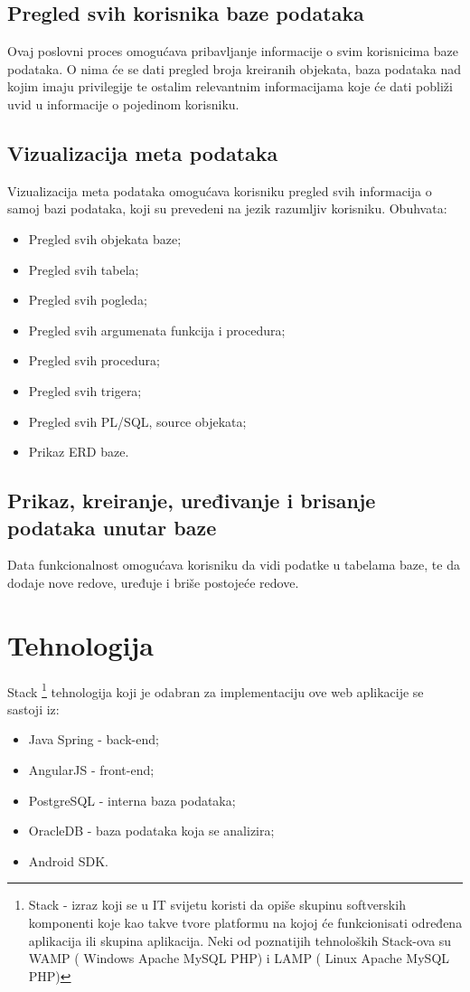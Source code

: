 \documentclass[12pt, a4paper]{report}
\theoremstyle{definition}
\begin{document}
\section{Pregled svih korisnika baze podataka}
Ovaj poslovni proces omogućava pribavljanje informacije o svim korisnicima baze podataka. O nima će se dati pregled broja kreiranih objekata, baza podataka nad kojim imaju privilegije te ostalim relevantnim informacijama koje će dati pobliži uvid u informacije o pojedinom korisniku.
\newpage
\section{Vizualizacija meta podataka}
Vizualizacija meta podataka omogućava korisniku pregled svih informacija o samoj bazi podataka, koji su prevedeni na jezik razumljiv korisniku.
Obuhvata:
\begin{itemize}
\item 	Pregled svih objekata baze;

\item Pregled svih tabela;

\item Pregled svih pogleda;

\item Pregled svih argumenata funkcija i procedura;

\item Pregled svih procedura;

\item Pregled svih trigera;

\item Pregled svih PL/SQL, source objekata;
\item Prikaz ERD baze.
\end{itemize}
\section{Prikaz, kreiranje, uređivanje i brisanje podataka unutar baze}
Data funkcionalnost omogućava korisniku da vidi podatke u tabelama baze, te da dodaje nove redove, uređuje i briše postojeće redove.

\chapter{Tehnologija}

Stack \footnote{Stack - izraz koji se u IT svijetu koristi da opiše skupinu softverskih komponenti koje kao takve tvore platformu na kojoj će funkcionisati određena aplikacija ili skupina aplikacija. Neki od poznatijih tehnoloških Stack-ova su WAMP ( Windows Apache MySQL PHP) i LAMP ( Linux Apache MySQL PHP)}  tehnologija koji je odabran za implementaciju ove web aplikacije se sastoji iz:
\begin{itemize}
	\item Java Spring - back-end;
	\item AngularJS - front-end;
	\item PostgreSQL - interna baza podataka;
	\item OracleDB - baza podataka koja se analizira;
	\item Android SDK.
\end{itemize}
\end{document}
